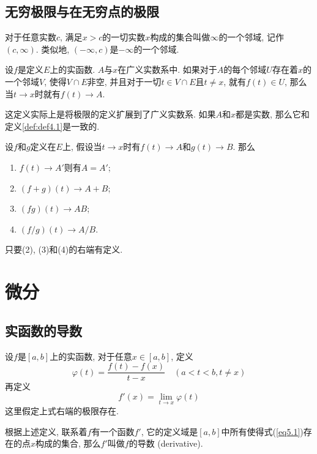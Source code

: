 \documentclass[cn,12pt,math=mtpro2,citestyle=gb7714-2015,bibstyle=gb7714-2015,twocol]{elegantbook}
\begin{document}
\section{无穷极限与在无穷点的极限}
\begin{definition}
对于任意实数$c$, 满足$x>c$的一切实数$x$构成的集合叫做$\infty$的一个邻域, 记作$(c,\infty)$. 类似地, $(-\infty,c)$是$-\infty$的一个邻域.
\end{definition}
\begin{definition}
设$f$是定义$E$上的实函数. $A$与$x$在广义实数系中. 如果对于$A$的每个邻域$U$存在着$x$的一个邻域$V$, 使得$V\cap E$非空, 并且对于一切$t\in V\cap E$且$t\neq x$, 就有$f(t)\in U$, 那么当$t\rightarrow x$时就有$f(t)\rightarrow A$.
\end{definition}
这定义实际上是将极限的定义扩展到了广义实数系. 如果$A$和$x$都是实数, 那么它和定义\ref{def:def4.1}是一致的.
\begin{theorem}
  设$f$和$g$定义在$E$上, 假设当$t\rightarrow x$时有$f(t)\rightarrow A$和$g(t)\rightarrow B$. 那么
  \begin{enumerate}[label=(\arabic*)]
  \item $f(t)\rightarrow A'$则有$A=A'$;

  \item $(f+g)(t)\rightarrow A+B$;

  \item $(fg)(t)\rightarrow AB$;

  \item $(f/g)(t)\rightarrow A/B$.
  \end{enumerate}
  只要(2), (3)和(4)的右端有定义.
\end{theorem}
\chapter{微分}
\section{实函数的导数}
\begin{definition}\label{def:def5.2}
设$f$是$[a,b]$上的实函数, 对于任意$x\in[a,b]$, 定义
\begin{equation}\label{eq5.14}
  \varphi(t)=\frac{f(t)-f(x)}{t-x} \quad (a<t<b, t\neq x)
\end{equation}
再定义
\begin{equation}\label{eq5.1}
  f'(x)=\lim_{t\rightarrow x}\varphi(t)
\end{equation}
这里假定上式右端的极限存在.
\end{definition}
根据上述定义, 联系着$f$有一个函数$f'$, 它的定义域是$[a,b]$中所有使得式(\ref{eq5.1})存在的点$x$构成的集合, 那么$f'$叫做$f$的导数 (derivative).
\end{document}
